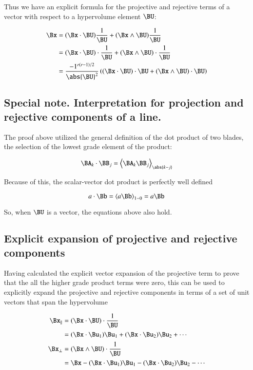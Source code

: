 Thus we have an explicit formula for the projective and rejective terms of a vector with respect to a hypervolume element $\BU$:

\begin{align*}
\Bx
&= (\Bx \cdot \BU)\frac{1}{\BU} + (\Bx \wedge \BU)\frac{1}{\BU} \\
&= (\Bx \cdot \BU) \cdot \frac{1}{\BU} + (\Bx \wedge \BU) \cdot \frac{1}{\BU} \\
&= \frac{-1^{r(r-1)/2}}{\abs{\BU}^2}
\left( (\Bx \cdot \BU) \cdot {\BU} + (\Bx \wedge \BU) \cdot {\BU} \right) \\
\end{align*}

\subsection{Special note.  Interpretation for projection and rejective components of a line. }

The proof above utilized the general definition of the dot product of two blades, the selection of the lowest grade element of the product:

\[
\BA_k \cdot \BB_j = \left<\BA_k \BB_j\right>_{\abs{k-j}}
\]

Because of this, the scalar-vector dot product is perfectly well defined

\[
a \cdot \Bb = \left<a \Bb\right>_{1-0} = a \Bb
\]

So, when $\BU$ is a vector, the equations above also hold.

\subsection{Explicit expansion of projective and rejective components }

Having calculated the explicit vector expansion of the projective term to prove that the all the higher grade
product terms were zero, this can be used to explicitly expand the projective and rejective components
in terms of a set of unit vectors that span the hypervolume

\begin{align*}
\Bx_\parallel 
&= (\Bx \cdot \BU) \cdot \frac{1}{\BU} \\
&= 
  (\Bx \cdot \Bu_1)\Bu_1
+ (\Bx \cdot \Bu_2)\Bu_2
+ \cdots \\
\Bx_\perp
&= (\Bx \wedge \BU) \cdot \frac{1}{\BU} \\
&= \Bx
- (\Bx \cdot \Bu_1)\Bu_1
- (\Bx \cdot \Bu_2)\Bu_2
- \cdots \\
\end{align*}


